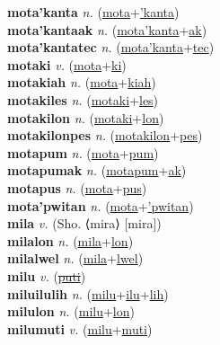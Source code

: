 \textbf{mota'kanta} \textit{n.} (\hyperref[mota]{mota}+\hyperref['kanta]{'kanta})
 \label{mota'kanta} \\
\textbf{mota'kantaak} \textit{n.} (\hyperref[mota'kanta]{mota'kanta}+\hyperref[ak]{ak})
 \label{mota'kantaak} \\
\textbf{mota'kantatec} \textit{n.} (\hyperref[mota'kanta]{mota'kanta}+\hyperref[tec]{tec})
 \label{mota'kantatec} \\
\textbf{motaki} \textit{v.} (\hyperref[mota]{mota}+\hyperref[ki]{ki})
 \label{motaki} \\
\textbf{motakiah} \textit{n.} (\hyperref[mota]{mota}+\hyperref[kiah]{kiah})
 \label{motakiah} \\
\textbf{motakiles} \textit{n.} (\hyperref[motaki]{motaki}+\hyperref[les]{les})
 \label{motakiles} \\
\textbf{motakilon} \textit{n.} (\hyperref[motaki]{motaki}+\hyperref[lon]{lon})
 \label{motakilon} \\
\textbf{motakilonpes} \textit{n.} (\hyperref[motakilon]{motakilon}+\hyperref[pes]{pes})
 \label{motakilonpes} \\
\textbf{motapum} \textit{n.} (\hyperref[mota]{mota}+\hyperref[pum]{pum})
 \label{motapum} \\
\textbf{motapumak} \textit{n.} (\hyperref[motapum]{motapum}+\hyperref[ak]{ak})
 \label{motapumak} \\
\textbf{motapus} \textit{n.} (\hyperref[mota]{mota}+\hyperref[pus]{pus})
 \label{motapus} \\
\textbf{mota'pwitan} \textit{n.} (\hyperref[mota]{mota}+\hyperref['pwitan]{'pwitan})
 \label{mota'pwitan} \\
\textbf{mila} \textit{v.} (Sho. ⟨mira⟩ [mira])
 \label{mila} \\
\textbf{milalon} \textit{n.} (\hyperref[mila]{mila}+\hyperref[lon]{lon})
 \label{milalon} \\
\textbf{milalwel} \textit{n.} (\hyperref[mila]{mila}+\hyperref[lwel]{lwel})
 \label{milalwel} \\
\textbf{milu} \textit{v.} (\hyperref[puti]{\sout{puti}})
 \label{milu} \\
\textbf{miluilulih} \textit{n.} (\hyperref[milu]{milu}+\hyperref[ilu]{ilu}+\hyperref[lih]{lih})
 \label{miluilulih} \\
\textbf{milulon} \textit{n.} (\hyperref[milu]{milu}+\hyperref[lon]{lon})
 \label{milulon} \\
\textbf{milumuti} \textit{v.} (\hyperref[milu]{milu}+\hyperref[muti]{muti})
 \label{milumuti} \\
